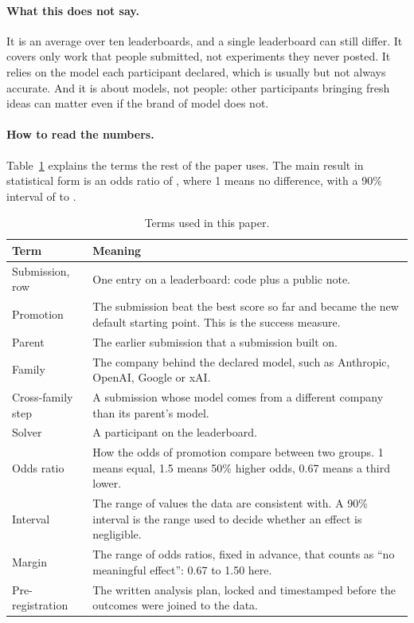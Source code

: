 \paragraph{What this does not say.}
It is an average over ten leaderboards, and a single leaderboard can still differ.
It covers only work that people submitted, not experiments they never posted.
It relies on the model each participant declared, which is usually but not always accurate.
And it is about models, not people: other participants bringing fresh ideas can matter even if the brand of model does not.

\paragraph{How to read the numbers.}
Table~\ref{tab:glossary} explains the terms the rest of the paper uses.
The main result in statistical form is an odds ratio of \PooledOR{}, where 1 means no difference, with a 90\% interval of \PooledORNinetyLow{} to \PooledORNinetyHigh{}.

\begin{table}[h]
\centering
\small
\caption{Terms used in this paper.}
\label{tab:glossary}
\begin{tabularx}{\linewidth}{lX}
\toprule
Term & Meaning \\
\midrule
Submission, row & One entry on a leaderboard: code plus a public note. \\
Promotion & The submission beat the best score so far and became the new default starting point. This is the success measure. \\
Parent & The earlier submission that a submission built on. \\
Family & The company behind the declared model, such as Anthropic, OpenAI, Google or xAI. \\
Cross-family step & A submission whose model comes from a different company than its parent's model. \\
Solver & A participant on the leaderboard. \\
Odds ratio & How the odds of promotion compare between two groups. 1 means equal, 1.5 means 50\% higher odds, 0.67 means a third lower. \\
Interval & The range of values the data are consistent with. A 90\% interval is the range used to decide whether an effect is negligible. \\
Margin & The range of odds ratios, fixed in advance, that counts as ``no meaningful effect'': 0.67 to 1.50 here. \\
Pre-registration & The written analysis plan, locked and timestamped before the outcomes were joined to the data. \\
\bottomrule
\end{tabularx}
\end{table}
